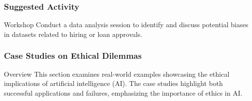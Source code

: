 \documentclass[aspectratio=169]{beamer}
\begin{document}
\begin{frame}[fragile]
    \frametitle{Suggested Activity}
    \begin{block}{Workshop}
        Conduct a data analysis session to identify and discuss potential biases in datasets related to hiring or loan approvals.
    \end{block}
\end{frame}

\begin{frame}[fragile]
    \frametitle{Case Studies on Ethical Dilemmas}
    \begin{block}{Overview}
        This section examines real-world examples showcasing the ethical implications of artificial intelligence (AI). 
        The case studies highlight both successful applications and failures, emphasizing the importance of ethics in AI.
    \end{block}
\end{frame}
\end{document}
